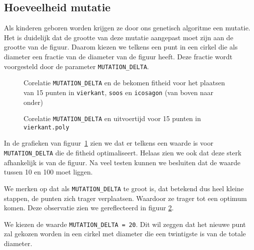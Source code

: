\subsection{Hoeveelheid mutatie}
Als kinderen geboren worden krijgen ze door ons genetisch algoritme een mutatie. Het is duidelijk dat de grootte van deze mutatie aangepast moet zijn aan de grootte van de figuur. Daarom kiezen we telkens een punt in een cirkel die als diameter een fractie van de diameter van de figuur heeft. Deze fractie wordt voorgesteld door de parameter \texttt{MUTATION\_DELTA}.
\begin{figure}[H]
\caption{Corelatie \texttt{MUTATION\_DELTA} en de bekomen fitheid voor het plaatsen van 15 punten in \texttt{vierkant}, \texttt{soos} en \texttt{icosagon} (van boven naar onder)}

\label{graf:mutationDeltaFig}
\end{figure}
\begin{figure}[H]

\caption{Corelatie \texttt{MUTATION\_DELTA} en uitvoertijd voor 15 punten in \texttt{vierkant.poly}}
\label{graf:mutationDeltaTime}
\end{figure}
In de grafieken van figuur~\ref{graf:mutationDeltaFig} zien we dat er telkens een waarde is voor \texttt{MUTATION\_DELTA} die de fitheid optimaliseert. Helaas zien we ook dat deze sterk afhankelijk is van de figuur. Na veel testen kunnen we besluiten dat de waarde tussen 10 en 100 moet liggen.

We merken op dat als \texttt{MUTATION\_DELTA} te groot is, dat betekend dus heel kleine stappen, de punten zich trager verplaatsen. Waardoor ze trager tot een optimum komen. Deze observatie zien we gereflecteerd in figuur \ref{graf:mutationDeltaTime}.

We kiezen de waarde \texttt{MUTATION\_DELTA = 20}. Dit wil zeggen dat het nieuwe punt zal gekozen worden in een cirkel met diameter die een twintigste is van de totale diameter.


















